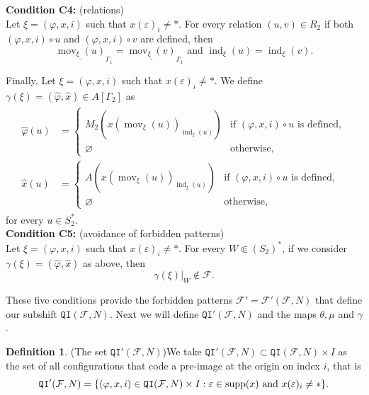 \documentclass{article}
\theoremstyle{definition}
\newtheorem{defn}[theorem]{Definition} %
\theoremstyle{definition}
\newcommand{\FF}{\mathcal{F}}
\newcommand{\Fo}{\mathcal{F}}
\newcommand{\QI}{\mathtt{QI}}
\newcommand{\mov}{\operatorname{mov}}
\newcommand{\ind}{\operatorname{ind}}
\newcommand{\supp}{\textnormal{supp}}
\begin{document}
\noindent
\textbf{Condition C4:} (relations)\\
Let $\xi=(\varphi,x,i)$ such that $x(\varepsilon)_i\neq \ast$. For every relation $(u,v) \in R_2$ if both $(\varphi,x,i)\circ u$ and $(\varphi,x,i)\circ v$ are defined, then 
\[\underline{\mov_{\xi}(u)}_{\Gamma_1} = \underline{\mov_{\xi}(v)}_{\Gamma_1} \mbox{ and } \ind_{\xi}(u) = \ind_{\xi}(v).\]

Finally, Let $\xi=(\varphi,x,i)$ such that $x(\varepsilon)_i\neq \ast$. We define $\gamma(\xi) = (\widehat{\varphi}, \widehat{x})\in A[\Gamma_2]$ as
\begin{align}\label{eq:induced_configurations_QI}
\begin{split}
    \widehat{\varphi}(u) & = \begin{cases}
    M_2(x(\mov_{\xi}(u))_{\ind_{\xi}(u)}) & \mbox{if } (\varphi, x, i)\circ u \mbox{ is defined},\\
    \varnothing  & \mbox{otherwise},
\end{cases}\\
\widehat{x}(u) & = \begin{cases}
    A(x(\mov_{\xi}(u))_{\ind_{\xi}(u)}) & \mbox{if } (\varphi, x, i)\circ u \mbox{ is defined},\\
    \varnothing & \mbox{otherwise},
\end{cases}
\end{split}
\end{align}
 for every $u \in S_2^*$. \\

\noindent
\textbf{Condition C5:} (avoidance of forbidden patterns)\\
Let $\xi=(\varphi,x,i)$ such that $x(\varepsilon)_i\neq \ast$. For every $W\Subset (S_2)^*$, if we consider $\gamma(\xi)=(\widehat{\varphi},\widehat{x})$ as above, then \[\gamma(\xi)|_{W} \notin \Fo.\]

These five conditions provide the forbidden patterns $\FF'=\Fo'(\Fo,N)$ that define our subshift $\QI(\Fo,N)$. Next we will define $\QI'(\Fo,N)$ and the maps $\theta,\mu$ and $\gamma$.

\begin{defn}(The set $\QI'(\Fo,N)$)\label{def:set}
    We take $\QI'(\Fo,N)\subset \QI(\Fo,N)\times I$ as the set of all configurations that code a pre-image at the origin on index $i$, that is \[ \QI'(\Fo,N) = \{ (\varphi,x,i) \in \QI(\Fo,N)\times I :\varepsilon \in \supp(x) \mbox{ and } x(\varepsilon)_i \neq \ast \}. \]
\end{defn}
\end{document}
